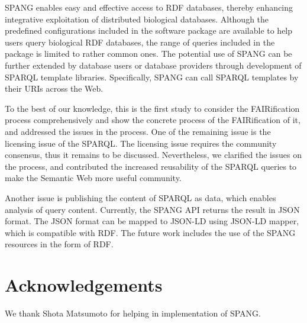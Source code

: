 \documentclass[runningheads]{llncs}
\begin{document}

SPANG enables easy and effective access to RDF databases, thereby enhancing integrative exploitation of distributed biological databases.
Although the predefined configurations included in the software package are available to help users query biological RDF databases, 
the range of queries included in the package is limited to rather common ones.
The potential use of SPANG can be further extended by database users or database providers through development of SPARQL template libraries.
Specifically, SPANG can call SPARQL templates by their URIs across the Web.

To the best of our knowledge, this is the first study to consider the FAIRification process comprehensively and show the concrete process of the FAIRification of it, and addressed the issues in the process. One of the remaining issue is the licensing issue of the SPARQL. The licensing issue requires the community consensus, thus it remains to be discussed. Nevertheless, we clarified the issues on the process, and contributed the increased reusability of the SPARQL queries to make the Semantic Web more useful community.

Another issue is publishing the content of SPARQL as data, which enables analysis of query content. Currently, the SPANG API returns the result in JSON format. The JSON format can be mapped to JSON-LD using JSON-LD mapper, which is compatible with RDF. The future work includes the use of the SPANG resources in the form of RDF.


\section*{Acknowledgements}
We thank Shota Matsumoto for helping in implementation of SPANG.
\end{document}
